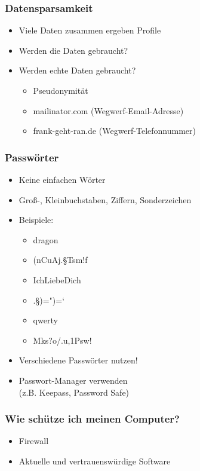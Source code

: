 \documentclass[12pt]{beamer}
\begin{document}
\begin{frame}
    \frametitle{Datensparsamkeit}
    \begin{itemize}
        \item<2-> Viele Daten zusammen ergeben Profile
        \item<3-> Werden die Daten gebraucht?
        \item<4-> Werden echte Daten gebraucht?
            \begin{itemize}
              \item<5-> Pseudonymität
              \item<6-> mailinator.com (Wegwerf-Email-Adresse)
	      \item<7-> frank-geht-ran.de (Wegwerf-Telefonnummer)
            \end{itemize}
    \end{itemize}
\end{frame}

\begin{frame}
    \frametitle{Passwörter}
    \begin{itemize}
        \item<2-> Keine einfachen Wörter
        \item<3-> Groß-, Kleinbuchstaben, Ziffern, Sonderzeichen
        \item<4-> Beispiele:
            \begin{itemize}
                \item<5-> dragon
                \item<6-> (nCuAj.§Tsm!f
                \item<7-> IchLiebeDich
                \item<8-> .§)=")=`
                \item<10-> qwerty
                \item<11-> Mks?o/.u,1Psw!
            \end{itemize}
        \item<12-> Verschiedene Passwörter nutzen!
        \item<13-> Passwort-Manager verwenden \\ (z.B. Keepass, Password Safe)
    \end{itemize}
\end{frame}

\begin{frame}
    \frametitle{Wie schütze ich meinen Computer?}
    \begin{itemize}
      \item Firewall
      \item Aktuelle und vertrauenswürdige Software
    \end{itemize}
\end{frame}
\end{document}
